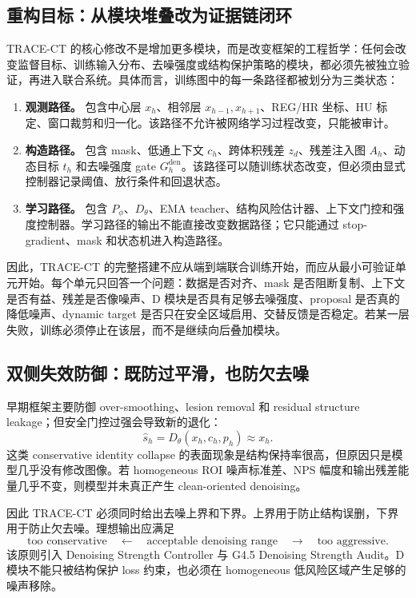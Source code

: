 \documentclass[11pt,a4paper,UTF8,fontset=fandol]{ctexart}
\theoremstyle{definition}
\begin{document}
\subsection{重构目标：从模块堆叠改为证据链闭环}

TRACE-CT 的核心修改不是增加更多模块，而是改变框架的工程哲学：任何会改变监督目标、训练输入分布、去噪强度或结构保护策略的模块，都必须先被独立验证，再进入联合系统。具体而言，训练图中的每一条路径都被划分为三类状态：
\begin{enumerate}
    \item \textbf{观测路径。} 包含中心层 $x_h$、相邻层 $x_{h-1},x_{h+1}$、REG/HR 坐标、HU 标定、窗口裁剪和归一化。该路径不允许被网络学习过程改变，只能被审计。
    \item \textbf{构造路径。} 包含 mask、低通上下文 $c_h$、跨体积残差 $z_d$、残差注入图 $A_h$、动态目标 $t_h$ 和去噪强度 gate $G_h^{\mathrm{den}}$。该路径可以随训练状态改变，但必须由显式控制器记录阈值、放行条件和回退状态。
    \item \textbf{学习路径。} 包含 $P_\phi$、$D_\theta$、EMA teacher、结构风险估计器、上下文门控和强度控制器。学习路径的输出不能直接改变数据路径；它只能通过 stop-gradient、mask 和状态机进入构造路径。
\end{enumerate}

因此，TRACE-CT 的完整搭建不应从端到端联合训练开始，而应从最小可验证单元开始。每个单元只回答一个问题：数据是否对齐、mask 是否阻断复制、上下文是否有益、残差是否像噪声、D 模块是否具有足够去噪强度、proposal 是否真的降低噪声、dynamic target 是否只在安全区域启用、交替反馈是否稳定。若某一层失败，训练必须停止在该层，而不是继续向后叠加模块。

\subsection{双侧失效防御：既防过平滑，也防欠去噪}

早期框架主要防御 over-smoothing、lesion removal 和 residual structure leakage；但安全门控过强会导致新的退化：
\begin{equation}
    \hat s_h=D_\theta(x_h,c_h,p_h)\approx x_h.
\end{equation}
这类 conservative identity collapse 的表面现象是结构保持率很高，但原因只是模型几乎没有修改图像。若 homogeneous ROI 噪声标准差、NPS 幅度和输出残差能量几乎不变，则模型并未真正产生 clean-oriented denoising。

因此 TRACE-CT 必须同时给出去噪上界和下界。上界用于防止结构误删，下界用于防止欠去噪。理想输出应满足
\begin{equation}
    \text{too conservative}
    \quad \leftarrow \quad
    \text{acceptable denoising range}
    \quad \rightarrow \quad
    \text{too aggressive}.
\end{equation}
该原则引入 Denoising Strength Controller 与 G4.5 Denoising Strength Audit。D 模块不能只被结构保护 loss 约束，也必须在 homogeneous 低风险区域产生足够的噪声移除。
\end{document}

